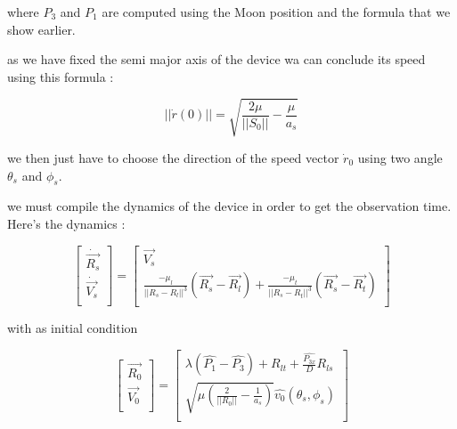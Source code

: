 \documentclass[11pt]{article} %
\begin{document}
		where $P_3$ and $P_1$ are computed using the Moon position and the formula that we show earlier.
		
		
		
		
		
		as we have fixed the semi major axis of the device wa can conclude its speed using this formula :
		
		$$
		||\dot{r}(0)||=\sqrt{\frac{2\mu}{||S_0||}-\frac{\mu}{a_s}}
		$$
		
		
		we then just have to choose the direction of the speed vector $\dot{r}_0$ using two angle $\theta_s$ and $\phi_s$.
		
		
		
		
		we must compile the dynamics of the device in order to get the observation time. Here's the dynamics : 
		
		$$
		\begin{bmatrix}
			\dot{\overrightarrow{R_{s}}}\\
			\dot{\overrightarrow{V_{s}}}\\
		\end{bmatrix} =\begin{bmatrix}
			\overrightarrow{V_{s}}\\
			\frac{-\mu_l }{||R_{s}-R_{l} ||^{3}}(\overrightarrow{R_{s}}-\overrightarrow{R_{l}}) + \frac{-\mu_t }{||R_{s}-R_{t} ||^{3}}(\overrightarrow{R_{s}}-\overrightarrow{R_{t}})\\
		\end{bmatrix}
		$$
		
		with as initial condition
		
		$$
		\begin{bmatrix}
			\overrightarrow{R_{0}}\\
			\overrightarrow{V_{0}}\\
		\end{bmatrix} =\begin{bmatrix}
			\lambda \left(\widehat{P_{1}} -\widehat{P_{3}}\right) +R_{lt} +\frac{\widehat{P_{3x}}}{D} R_{ls}\\
			\sqrt{\mu \left(\frac{2}{||R_{0} ||} -\frac{1}{a_s}\right)}\widehat{v_{0}}( \theta _{s} ,\phi _{s})\\
		\end{bmatrix}
		$$
		
\end{document}
